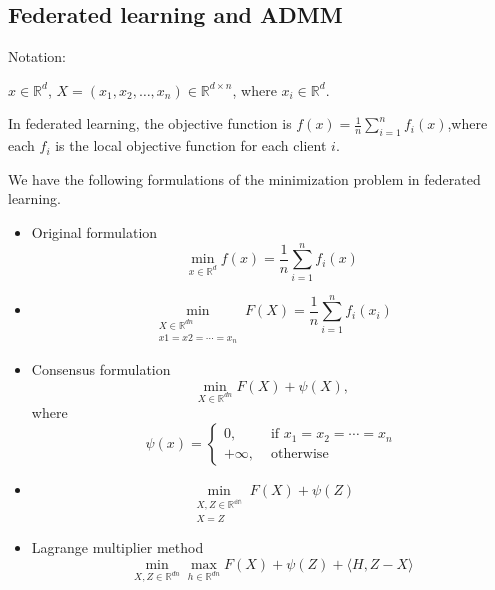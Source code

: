 \begin{itemize}
\newpage 


\section{Federated learning and ADMM}
Notation:

$x \in \mathbb{R}^d$, $X = (x_1, x_2 ,\dots,x_n) \in \mathbb{R}^{d\times n}$, where $x_i \in \mathbb{R}^d$.

In federated learning, the objective function is $f(x) = \frac{1}{n} \sum_{i = 1}^n f_i(x)$,where each $f_i$ is the local objective function for each client $i$. 

We have the following formulations of the minimization problem in federated learning. 

\begin{itemize} 
    \item Original formulation \begin{equation}\label{Fed: original}
        \min_{x \in \mathbb{R}^d} f(x) = \frac{1}{n} \sum_{i = 1}^n f_i(x)
    \end{equation} 
    \item 
    \begin{equation}
        \min_{\substack{X \in \mathbb{R}^{dn} \\x1 = x2 = \cdots = x_n }} F(X) = \frac{1}{n} \sum_{i = 1}^n f_i(x_i)
    \end{equation}
    \item Consensus formulation
        \begin{equation}  \label{Fed: concensus}
        \min_{X \in \mathbb{R}^{dn}} F(X) + \psi(X),
    \end{equation}
    where 
    \begin{equation}\label{psi}
    \psi(x) =  \left \{ \begin{array}{cc} 
    0, & \mbox{ if }  x_1 = x_2 = \cdots = x_n \\
    +\infty, & \mbox{ otherwise } 
    \end{array} \right . 
    \end{equation}
\item 
    \begin{equation}
    \min_{ \substack{X,Z \in \mathbb{R^{dn}} \\ X = Z}} F(X) + \psi(Z)
    \end{equation}
\item Lagrange multiplier method
    \begin{equation} \label{Fed: Lagrange}
        \min_{X,Z \in \mathbb{R}^{dn}} \max_{h \in \mathbb{R}^{dn} } F(X) + \psi(Z) + \langle H, Z- X \rangle

\end{equation}
\end{itemize}
\end{itemize}

